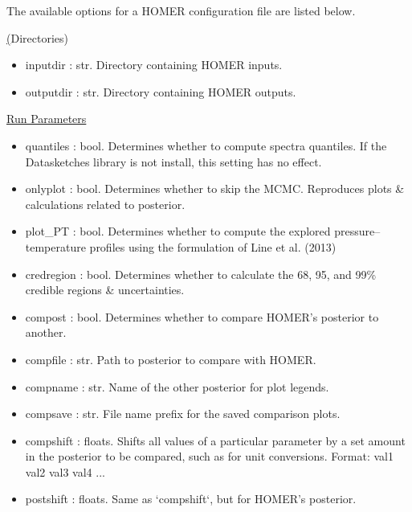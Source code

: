 \documentclass[letterpaper, 12pt]{article}
\begin{document}
\noindent The available options for a HOMER configuration file are listed below.

\noindent \underline(Directories)
\begin{itemize}
\item inputdir   : str.  Directory containing HOMER inputs.
\item outputdir  : str.  Directory containing HOMER outputs.
\end{itemize}

\noindent \underline{Run Parameters}
\begin{itemize}
\item quantiles   : bool. Determines whether to compute spectra quantiles.
                    If the Datasketches library is not install, this setting 
                    has no effect.
\item onlyplot    : bool. Determines whether to skip the MCMC.
                    Reproduces plots \& calculations related to posterior.
\item plot\_PT    : bool. Determines whether to compute the explored 
                    pressure--temperature profiles using the formulation of 
                    Line et al. (2013)
\item credregion  : bool. Determines whether to calculate the 68, 95, and 99\% 
                    credible regions \& uncertainties.
\item compost     : bool. Determines whether to compare HOMER's posterior to 
                          another.
\item compfile    : str.  Path to posterior to compare with HOMER.
\item compname    : str.  Name of the other posterior for plot legends.
\item compsave    : str.  File name prefix for the saved comparison plots.
\item compshift   : floats. Shifts all values of a particular parameter by a 
                          set amount in the posterior to be compared, such as 
                          for unit conversions.
                    Format: val1 val2 val3 val4 ...
\item postshift   : floats. Same as `compshift`, but for HOMER's posterior.
\end{itemize}
\end{document}
